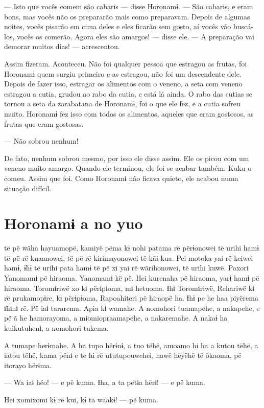 --- Isto que vocês comem são cabaris --- disse Horonamɨ. --- São
cabaris, e eram bons, mas vocês não os prepararão mais como preparavam.
Depois de algumas noites, vocês pisarão em cima deles e eles ficarão sem
gosto, aí vocês vão buscá-los, vocês os comerão. Agora eles são
amargos! --- disse ele. --- A preparação vai demorar muitos
dias! --- acrescentou. 

Assim fizeram. Aconteceu. Não foi qualquer pessoa que estragou as
frutas, foi Horonamɨ quem surgiu primeiro e as estragou, não foi um
descendente dele. Depois de fazer isso, estragar os alimentos com o
veneno, a seta com veneno estragou a cutia, grudou ao rabo da cutia, e
está lá ainda. O rabo das cutias se tornou a seta da zarabatana de
Horonamɨ, foi o que ele fez, e a cutia sofreu muito. Horonamɨ fez isso
com todos os alimentos, aqueles que eram gostosos, as frutas que eram
gostosas. 

--- Não sobrou nenhum!

De fato, nenhum sobrou mesmo, por isso ele disse assim. Ele os picou com
um veneno muito amargo. Quando ele terminou, ele foi se acabar também:
Kuku o comeu. Assim que foi. Como Horonamɨ não ficava quieto, ele acabou
numa situação difícil. 

\chapter{Horonamɨ a no yuo}

 të pë wãha hayuamopë, kamiyë pëma kɨ nohi patama rë përɨonowei të
urihi hamɨ të pë rë kuaanowei, të pë rë kirimayonowei të kãi kua. Pei
motoka yai rë keiwei hamɨ, ɨ̃hɨ të urihi pata hamɨ të pë xi yai rë
wãrihonowei, të urihi kuwë. Paxori Yanomamɨ pë hiraoma. Yanomamɨ kë pë.
Hei kurenaha pë hiraoma, yarɨ hamɨ pë hiraoma. Toromɨriwë xo kɨ
përɨpɨoma, mɨ hetuoma. Ɨhɨ Toromɨriwë, Rehariwë kɨ rë prukamopɨre, kɨ
përɨpɨoma, Rapoahiteri pë hiraopë ha. Ɨhɨ pe he haa piyërema ɨ̃hɨnɨ rë. Pë
iaɨ tararema. Apia kɨ wamahe. A nomohori tuamapehe, a nakapehe, e pë ã
he hamorayoma, a miomiopraamapehe, a nakaremahe. A nakaɨ ha kuikutuhenɨ,
a nomohori tukema. 

A tumape herɨmahe. A ha tupo hërɨnɨ, a tuo tëhë, amoamo hi ha a kutou
tëhë, a iatou tëhë, kama pënɨ e te hi rë ututupouwehei, hawë hëyëhë të
õkaoma, pë itorayo hërɨma. 

--- Wa iaɨ hëo! --- e pë kuma. Ɨha, a ta pëtɨa hërɨ! --- e pë kuma. 

Hei xomixomi kɨ rë kui, kɨ ta waakɨ! --- pë kuma. 

